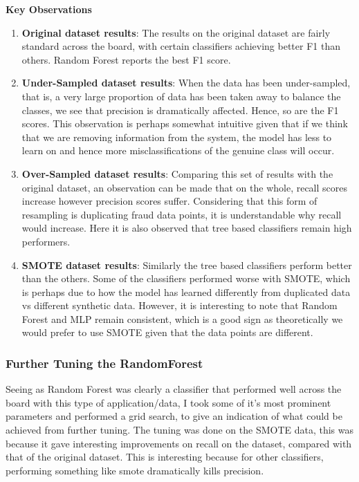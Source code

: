 \documentclass[12pt,a4paper,twoside]{report}
\begin{document}
\pagebreak
\textbf{Key Observations}
\begin{enumerate}
\item \textbf{Original dataset results}: The results on the original dataset are fairly standard across the board, with certain classifiers achieving better F1 than others. Random Forest reports the best F1 score. 

\item \textbf{Under-Sampled dataset results}: When the data has been under-sampled, that is, a very large proportion of data has been taken away to balance the classes, we see that precision is dramatically affected. Hence, so are the F1 scores. This observation is perhaps somewhat intuitive given that if we think that we are removing information from the system, the model has less to learn on and hence more misclassifications of the genuine class will occur. 

\item \textbf{Over-Sampled dataset results}: Comparing this set of results with the original dataset, an observation can be made that on the whole, recall scores increase however precision scores suffer. Considering that this form of resampling is duplicating fraud data points, it is understandable why recall would increase. Here it is also observed that tree based classifiers remain high performers. 

\item \textbf{SMOTE dataset results}: Similarly the tree based classifiers perform better than the others. Some of the classifiers performed worse with SMOTE, which is perhaps due to how the model has learned differently from duplicated data vs different synthetic data. However, it is interesting to note that Random Forest and MLP remain consistent, which is a good sign as theoretically we would prefer to use SMOTE given that the data points are different. 
 
\end{enumerate}

\subsubsection{Further Tuning the RandomForest }
Seeing as Random Forest was clearly a classifier that performed well across the board with this type of application/data, I took some of it's most prominent parameters and performed a grid search, to give an indication of what could be achieved from further tuning. The tuning was done on the SMOTE data, this was because it gave interesting improvements on recall on the dataset, compared with that of the original dataset. This is interesting because for other classifiers, performing something like smote dramatically kills precision. 
\end{document}
